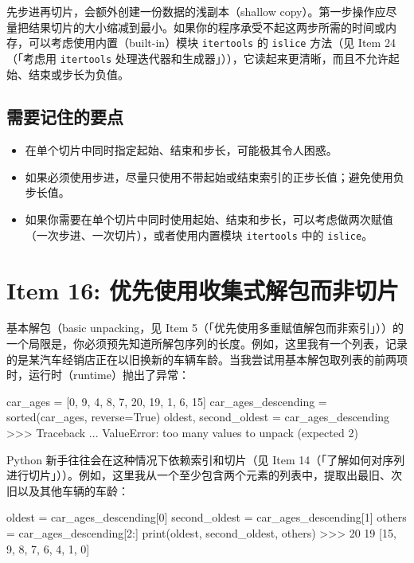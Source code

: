 先步进再切片，会额外创建一份数据的浅副本（shallow copy）。第一步操作应尽量把结果切片的大小缩减到最小。如果你的程序承受不起这两步所需的时间或内存，可以考虑使用内置（built-in）模块 \texttt{itertools} 的 \texttt{islice} 方法（见 Item 24（「考虑用 \texttt{itertools} 处理迭代器和生成器」）），它读起来更清晰，而且不允许起始、结束或步长为负值。

\subsection{需要记住的要点}

\begin{itemize}
\item 在单个切片中同时指定起始、结束和步长，可能极其令人困惑。
\item 如果必须使用步进，尽量只使用不带起始或结束索引的正步长值；避免使用负步长值。
\item 如果你需要在单个切片中同时使用起始、结束和步长，可以考虑做两次赋值（一次步进、一次切片），或者使用内置模块 \texttt{itertools} 中的 \texttt{islice}。
\end{itemize}

\section{Item 16: 优先使用收集式解包而非切片}

基本解包（basic unpacking，见 Item 5（「优先使用多重赋值解包而非索引」））的一个局限是，你必须预先知道所解包序列的长度。例如，这里我有一个列表，记录的是某汽车经销店正在以旧换新的车辆车龄。当我尝试用基本解包取列表的前两项时，运行时（runtime）抛出了异常：

\begin{codebox}[python]
car_ages = [0, 9, 4, 8, 7, 20, 19, 1, 6, 15]
car_ages_descending = sorted(car_ages, reverse=True)
oldest, second_oldest = car_ages_descending
>>>
Traceback ...
ValueError: too many values to unpack (expected 2)
\end{codebox}

Python 新手往往会在这种情况下依赖索引和切片（见 Item 14（「了解如何对序列进行切片」））。例如，这里我从一个至少包含两个元素的列表中，提取出最旧、次旧以及其他车辆的车龄：

\begin{codebox}[python]
oldest = car_ages_descending[0]
second_oldest = car_ages_descending[1]
others = car_ages_descending[2:]
print(oldest, second_oldest, others)
>>>
20 19 [15, 9, 8, 7, 6, 4, 1, 0]
\end{codebox}

